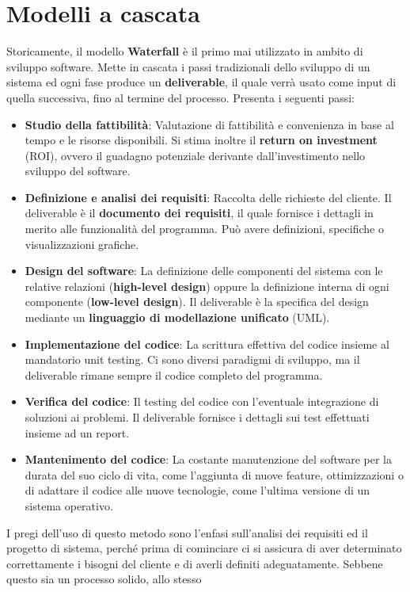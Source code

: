 \section{Modelli a cascata}
Storicamente, il modello \textbf{Waterfall} è il primo mai utilizzato in ambito di sviluppo software. Mette in cascata i passi tradizionali dello
sviluppo di un sistema ed ogni fase produce un \textbf{deliverable}, il quale verrà usato come input di quella successiva, fino al termine del processo.
Presenta i seguenti passi: \begin{itemize}
	\item \textbf{Studio della fattibilità}: Valutazione di fattibilità e convenienza in base al tempo e le risorse disponibili. Si stima inoltre il
	\textbf{return on investment} (ROI), ovvero il guadagno potenziale derivante dall'investimento nello sviluppo del software.
	\item \textbf{Definizione e analisi dei requisiti}: Raccolta delle richieste del cliente. Il deliverable è il \textbf{documento dei requisiti}, il
	quale fornisce i dettagli in merito alle funzionalità del programma. Può avere definizioni, specifiche o visualizzazioni grafiche.
	\item \textbf{Design del software}: La definizione delle componenti del sistema con le relative relazioni (\textbf{high-level design}) oppure la
	definizione interna di ogni componente (\textbf{low-level design}). Il deliverable è la specifica del design mediante un \textbf{linguaggio di
	modellazione unificato} (UML).
	\item \textbf{Implementazione del codice}: La scrittura effettiva del codice insieme al mandatorio unit testing. Ci sono diversi paradigmi di
	sviluppo, ma il deliverable rimane sempre il codice completo del programma.
	\item \textbf{Verifica del codice}: Il testing del codice con l'eventuale integrazione di soluzioni ai problemi. Il deliverable fornisce i dettagli
	sui test effettuati insieme ad un report.
	\item \textbf{Mantenimento del codice}: La costante manutenzione del software per la durata del suo ciclo di vita, come l'aggiunta di nuove
	feature, ottimizzazioni o di adattare il codice alle nuove tecnologie, come l'ultima versione di un sistema operativo.
\end{itemize}
\noindent I pregi dell'uso di questo metodo sono l'enfasi sull'analisi dei requisiti ed il progetto di sistema, perché prima di cominciare ci si
assicura di aver determinato correttamente i bisogni del cliente e di averli definiti adeguatamente. Sebbene questo sia un processo solido, allo stesso
